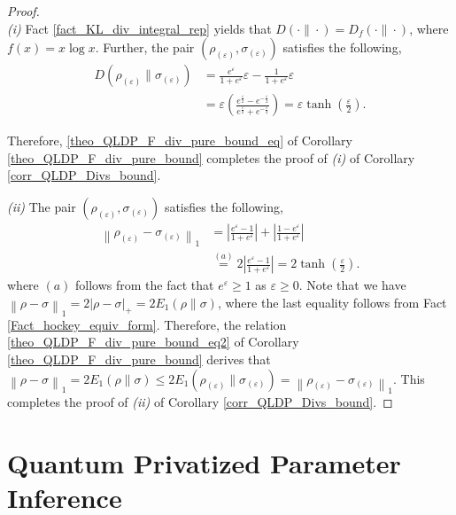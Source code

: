 \documentclass[onecolumn,ldraftcls, 11pt]{IEEEtran}
\newcommand{\nn}{\nonumber}
\newcommand{\eps}{\varepsilon}
\newcommand{\norm}[2]{{\left\lVert #1 \right\rVert}_{#2}}
\newcommand{\abs}[1]{\left\vert#1\right\vert}
\begin{document}
\begin{proof}
    \hfill\\
    \emph{(i)} Fact \ref{fact_KL_div_integral_rep} yields that $D(\cdot\|\cdot) = D_{f}(\cdot\|\cdot)$, where $f(x) = x \log x$. 
    Further, the pair $(\rho_{(\eps)},\sigma_{(\eps)})$ satisfies the following,
    \begin{align}
        D(\rho_{(\eps)}\|\sigma_{(\eps)}) &= \frac{e^\eps}{1+e^\eps} \eps - \frac{1}{1+e^\eps}\eps\nn\\
                          &= \eps\left(\frac{e^{\frac{\eps}{2}} - e^{-\frac{\eps}{2}}}{e^{\frac{\eps}{2}} + e^{-\frac{\eps}{2}}}\right)
                          = \eps \tanh\left(\frac{\eps}{2}\right).
    \end{align}

Therefore, \eqref{theo_QLDP_F_div_pure_bound_eq} of Corollary \ref{theo_QLDP_F_div_pure_bound} completes the proof of \emph{(i)} of Corollary \ref{corr_QLDP_Divs_bound}.
 

 
\emph{(ii)} The pair $(\rho_{(\eps)},\sigma_{(\eps)})$ satisfies the following,
    \begin{align}
       \norm{\rho_{(\eps)}-\sigma_{(\eps)}}{1} &= \abs{\frac{e^\eps - 1}{1+ e^\eps}} + \abs{\frac{1 - e^\eps}{1+ e^\eps}}\nn\\
                          &\overset{(a)}{=} 2\abs{\frac{e^\eps - 1}{1+ e^\eps}}
                          = 2 \tanh\left(\frac{\eps}{2}\right).
    \end{align}
where $(a)$ follows from the fact that $e^\eps \geq 1$ as $\eps \geq 0$.
Note that we have $\norm{\rho-\sigma}{1} = 2 \abs{\rho-\sigma}_{+} = 2 E_{1}(\rho\|\sigma)$, where the last equality follows from Fact \ref{Fact_hockey_equiv_form}.
 Therefore, the relation \eqref{theo_QLDP_F_div_pure_bound_eq2} of Corollary \ref{theo_QLDP_F_div_pure_bound} derives that $\norm{\rho-\sigma}{1} = 2E_{1}(\rho\|\sigma) \leq  2E_{1}(\rho_{(\eps)}\|\sigma_{(\eps)}) = \norm{\rho_{(\eps)}-\sigma_{(\eps)}}{1}$. This completes the proof of \emph{(ii)} of Corollary \ref{corr_QLDP_Divs_bound}.    
\end{proof}

\section{Quantum Privatized Parameter Inference}\label{sec:fisher}
\end{document}
